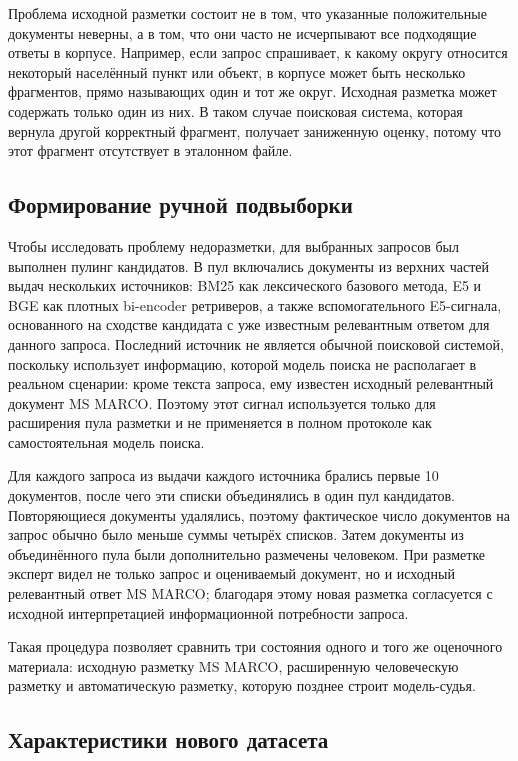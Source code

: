 \documentclass[runningheads,a4paper]{llncs}
\begin{document}
Проблема исходной разметки состоит не в том, что указанные положительные документы неверны, а в том, что они часто не исчерпывают все подходящие ответы в корпусе. Например, если запрос спрашивает, к какому округу относится некоторый населённый пункт или объект, в корпусе может быть несколько фрагментов, прямо называющих один и тот же округ. Исходная разметка может содержать только один из них. В таком случае поисковая система, которая вернула другой корректный фрагмент, получает заниженную оценку, потому что этот фрагмент отсутствует в эталонном файле.

\subsection{Формирование ручной подвыборки}

Чтобы исследовать проблему недоразметки, для выбранных запросов был выполнен пулинг кандидатов. В пул включались документы из верхних частей выдач нескольких источников: BM25 как лексического базового метода, E5 и BGE как плотных bi-encoder ретриверов, а также вспомогательного E5-сигнала, основанного на сходстве кандидата с уже известным релевантным ответом для данного запроса. Последний источник не является обычной поисковой системой, поскольку использует информацию, которой модель поиска не располагает в реальном сценарии: кроме текста запроса, ему известен исходный релевантный документ MS MARCO. Поэтому этот сигнал используется только для расширения пула разметки и не применяется в полном протоколе как самостоятельная модель поиска.

Для каждого запроса из выдачи каждого источника брались первые 10 документов, после чего эти списки объединялись в один пул кандидатов. Повторяющиеся документы удалялись, поэтому фактическое число документов на запрос обычно было меньше суммы четырёх списков. Затем документы из объединённого пула были дополнительно размечены человеком. При разметке эксперт видел не только запрос и оцениваемый документ, но и исходный релевантный ответ MS MARCO; благодаря этому новая разметка согласуется с исходной интерпретацией информационной потребности запроса.

Такая процедура позволяет сравнить три состояния одного и того же оценочного материала: исходную разметку MS MARCO, расширенную человеческую разметку и автоматическую разметку, которую позднее строит модель-судья.

\subsection{Характеристики нового датасета}
\end{document}

